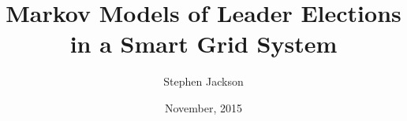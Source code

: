 \documentclass[12pt,oneside]{article}
\begin{document}
\title{Markov Models of Leader Elections in a Smart Grid System}
\author{Stephen Jackson}
\date{November, 2015}
\maketitle









%
%
\end{document}

